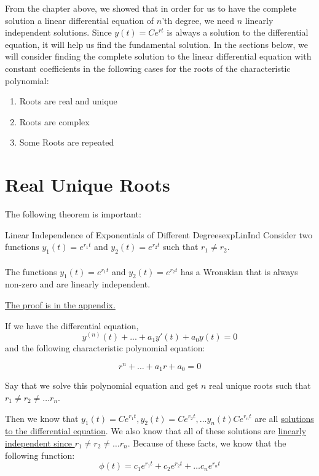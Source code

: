 \documentclass{report}
\begin{document}
From the chapter above, we showed that in order for us to have the complete solution a linear differential equation of $n$'th degree, we need $n$ linearly independent solutions. Since $y(t) = Ce^{rt}$ is always a solution to the differential equation, it will help us find the fundamental solution. 
In the sections below, we will consider finding the complete solution to the linear differential equation with constant coefficients in the following cases for the roots of the characteristic polynomial:
\begin{enumerate}
    \item Roots are real and unique
    \item Roots are complex
    \item Some Roots are repeated
\end{enumerate}


\section{Real Unique Roots}

The following theorem is important:

\begin{mytheo}{Linear Independence of Exponentials of Different Degrees}{expLinInd}
    Consider two functions $y_1(t) = e^{r_1t}$ and $y_2(t) = e^{r_2t}$ such that $r_1 \neq r_2$. 
    \\
    \\
    The functions $y_1(t) = e^{r_1t}$ and $y_2(t) = e^{r_2t}$ has a Wronskian that is always non-zero and are linearly independent.
\end{mytheo}

\hyperref[sec:prExpLinInd]{The proof is in the appendix.}

If we have the differential equation, 
$$y^{(n)}(t) + ... + a_1y'(t) + a_0y(t) = 0$$
and the following characteristic polynomial equation:

$$r^n+\dots+a_1r+a_0=0$$

Say that we solve this polynomial equation and get $n$ real unique roots such that $r_1 \neq r_2 \neq \dots r_n$. 

Then we know that $y_1(t) = Ce^{r_1t}, y_2(t) = Ce^{r_2t}, \dots y_n(t)Ce^{r_nt}$ are all \hyperref[th:constSol]{solutions to the differential equation}. We also know that all of these solutions are \hyperref[th:expLinInd]{linearly independent since $r_1 \neq r_2 \neq \dots r_n$}. Because of these facts, we know that the following function:
$$\phi(t) = c_1e^{r_1t}+c_2e^{r_2t}+\dots c_ne^{r_nt}$$
\end{document}
